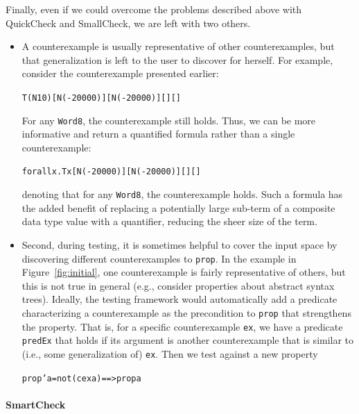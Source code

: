\documentclass{sigplanconf}
\newenvironment{code}{\begin{alltt}}{\end{alltt}}
\newcommand{\ttp}[1]{\texttt{#1}}
\begin{document}
Finally, even if we could overcome the problems described above with QuickCheck
and SmallCheck, we are left with two others.
\begin{itemize}
  \item A counterexample is usually representative of other counterexamples, but
    that generalization is left to the user to discover for herself.  For
    example, consider the counterexample presented earlier:
%
\begin{code}
T (N 10) [N (-20000)] [N (-20000)] [] []
\end{code}
%
\noindent
For any \ttp{Word8}, the counterexample still holds.  Thus, we can be more
informative and return a quantified formula rather than a single counterexample:
%
\begin{code}
forall x . T x [N (-20000)] [N (-20000)] [] []
\end{code}
%
\noindent
denoting that for any \ttp{Word8}, the counterexample holds.  Such a formula has
the added benefit of replacing a potentially large sub-term of a composite data
type value with a quantifier, reducing the sheer size of the term.

  \item Second, during testing, it is sometimes helpful to cover the input space
    by discovering different counterexamples to \ttp{prop}.  In the example in
    Figure~\ref{fig:initial}, one counterexample is fairly representative of
    others, but this is not true in general (e.g., consider properties about
    abstract syntax trees).  Ideally, the testing framework would automatically
    add a predicate characterizing a counterexample as the precondition to
    \ttp{prop} that strengthens the property.  That is, for a specific
    counterexample \ttp{ex}, we have a predicate \ttp{predEx} that holds if its
    argument is another counterexample that is similar to (i.e., some
    generalization of) \ttp{ex}.  Then we test against a new property
%
\begin{code}
prop' a = not (cex a) ==> prop a
\end{code}
%
\end{itemize}

\paragraph{SmartCheck}
\end{document}
